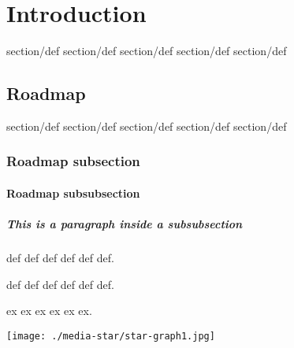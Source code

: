 \chapter{Introduction}
\label{ch:intro}

\begin{definition}
section/def section/def section/def
section/def section/def
\end{definition}

\section{Roadmap}
\label{sec:roadmap}

\begin{definition}
\label{def:one}
section/def section/def section/def
section/def section/def
\end{definition}

\subsection{Roadmap subsection}

\subsubsection{Roadmap subsubsection}
\paragraph{This is a paragraph inside a subsubsection}

\begin{definition}
\label{def:title}
  def def def
  def
  def def.
\end{definition}

\begin{group}
  
\begin{definition}
\label{def:title}
  def def def
  def
  def def.
\end{definition}

\begin{example}
\label{ex:title}
  ex ex ex
  ex
  ex ex.
  \begin{center}
  \texttt{[image: ./media-star/star-graph1.jpg]}
  \end{center}
\end{example}
\end{group}
